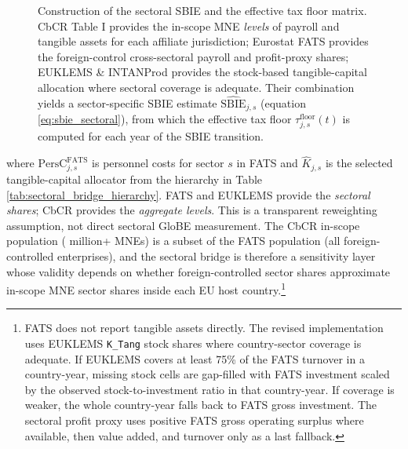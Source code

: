 \documentclass[11pt,a4paper]{article}
\newcommand{\EUR}{\texteuro}
\newcommand{\code}[1]{\texttt{#1}}
\begin{document}
\begin{figure}[H]
\caption[CbCR$\,\times\,$FATS and EUKLEMS construction of sectoral SBIE.]{Construction of the sectoral SBIE and the effective tax floor matrix. CbCR Table I provides the in-scope MNE \emph{levels} of payroll and tangible assets for each affiliate jurisdiction; Eurostat FATS provides the foreign-control cross-sectoral payroll and profit-proxy shares; EUKLEMS \& INTANProd provides the stock-based tangible-capital allocation where sectoral coverage is adequate. Their combination yields a sector-specific SBIE estimate $\widehat{\text{SBIE}}_{j,s}$ (equation \ref{eq:sbie_sectoral}), from which the effective tax floor $\tau^{\text{floor}}_{j,s}(t)$ is computed for each year of the SBIE transition.}
\label{fig:cbcr_fats_combo}
\end{figure}

where $\text{PersC}_{j,s}^{\text{FATS}}$ is personnel costs for sector $s$ in FATS and $\hat{K}_{j,s}$ is the selected tangible-capital allocator from the hierarchy in Table \ref{tab:sectoral_bridge_hierarchy}. FATS and EUKLEMS provide the \emph{sectoral shares}; CbCR provides the \emph{aggregate levels}. This is a transparent reweighting assumption, not direct sectoral GloBE measurement. The CbCR in-scope population (\EUR750 million+ MNEs) is a subset of the FATS population (all foreign-controlled enterprises), and the sectoral bridge is therefore a sensitivity layer whose validity depends on whether foreign-controlled sector shares approximate in-scope MNE sector shares inside each EU host country.\footnote{FATS does not report tangible assets directly. The revised implementation uses EUKLEMS \code{K\_Tang} stock shares where country-sector coverage is adequate. If EUKLEMS covers at least 75\% of the FATS turnover in a country-year, missing stock cells are gap-filled with FATS investment scaled by the observed stock-to-investment ratio in that country-year. If coverage is weaker, the whole country-year falls back to FATS gross investment. The sectoral profit proxy uses positive FATS gross operating surplus where available, then value added, and turnover only as a last fallback.}
\end{document}
